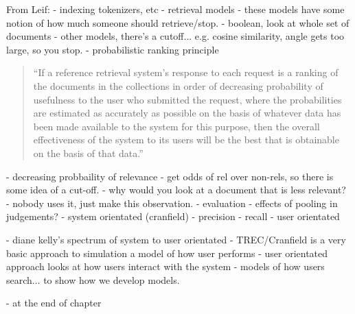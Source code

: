 From Leif:
- indexing
    tokenizers, etc
- retrieval models
    - these models have some notion of how much someone should retrieve/stop.
    - boolean, look at whole set of documents
    - other models, there's a cutoff... e.g. cosine similarity, angle gets too large, so you stop.
    - probabilistic ranking principle
    
        \begin{quote}
            ``If a reference retrieval system's response to each request is a ranking of the documents in the collections in order of decreasing probability of usefulness to the user who submitted the request, where the probabilities are estimated as accurately as possible on the basis of whatever data has been made available to the system for this purpose, then the overall effectiveness of the system to its users will be the best that is obtainable on the basis of that data.''
        \end{quote}
    
    
        - decreasing probbaility of relevance
        - get odds of rel over non-rels, so there is some idea of a cut-off.
        - why would you look at a document that is less relevant?
        - nobody uses it, just make this observation.
- evaluation
    - effects of pooling in judgements?
    - system orientated (cranfield)
        - precision
        - recall
    - user orientated
    
    - diane kelly's spectrum of system to user orientated
        - TREC/Cranfield is a very basic approach to simulation
            a model of how user performs
        - user orientated approach looks at how users interact with the system
        - models of how users search... to show how we develop models.
        
        - at the end of chapter

